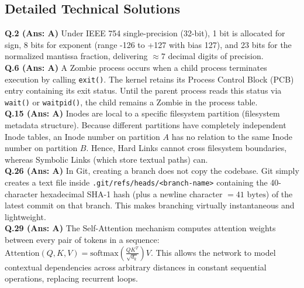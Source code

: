 \vspace{3mm}
\subsection*{Detailed Technical Solutions}

\begin{solutionbox}
\textbf{Q.2 (Ans: A)} Under IEEE 754 single-precision (32-bit), 1 bit is allocated for sign, 8 bits for exponent (range -126 to +127 with bias 127), and 23 bits for the normalized mantissa fraction, delivering $\approx 7$ decimal digits of precision.\\[2mm]
\textbf{Q.6 (Ans: A)} A Zombie process occurs when a child process terminates execution by calling \texttt{exit()}. The kernel retains its Process Control Block (PCB) entry containing its exit status. Until the parent process reads this status via \texttt{wait()} or \texttt{waitpid()}, the child remains a Zombie in the process table.\\[2mm]
\textbf{Q.15 (Ans: A)} Inodes are local to a specific filesystem partition (filesystem metadata structure). Because different partitions have completely independent Inode tables, an Inode number on partition $A$ has no relation to the same Inode number on partition $B$. Hence, Hard Links cannot cross filesystem boundaries, whereas Symbolic Links (which store textual paths) can.\\[2mm]
\textbf{Q.26 (Ans: A)} In Git, creating a branch does not copy the codebase. Git simply creates a text file inside \texttt{.git/refs/heads/<branch-name>} containing the 40-character hexadecimal SHA-1 hash (plus a newline character $= 41\text{ bytes}$) of the latest commit on that branch. This makes branching virtually instantaneous and lightweight.\\[2mm]
\textbf{Q.29 (Ans: A)} The Self-Attention mechanism computes attention weights between every pair of tokens in a sequence: $\text{Attention}(Q, K, V) = \text{softmax}\left(\frac{QK^T}{\sqrt{d_k}}\right)V$. This allows the network to model contextual dependencies across arbitrary distances in constant sequential operations, replacing recurrent loops.
\end{solutionbox}

\newpage
